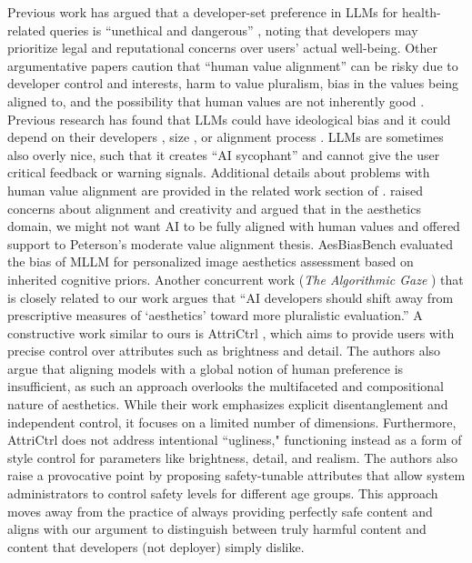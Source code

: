 Previous work has argued that a developer-set preference in LLMs for health-related queries is ``unethical and dangerous'' \cite{guo_position_2025}, noting that developers may prioritize legal and reputational concerns over users’ actual well-being. Other argumentative papers caution that ``human value alignment'' can be risky due to developer control and interests, harm to value pluralism, bias in the values being aligned to, and the possibility that human values are not inherently good \cite{sutrop_challenges_2020, arzberger_nothing_2024, turchin_ai_2019}. Previous research has found that LLMs could have ideological bias \cite{rozado_measuring_2025, faulborn_only_2025, buyl_large_2025, rettenberger_assessing_2025} and it could depend on their developers \cite{buyl_large_2025}, size \cite{rettenberger_assessing_2025}, or alignment process \cite{faulborn_only_2025}. LLMs are sometimes also overly nice, such that it creates ``AI sycophant'' \cite{guo_position_2025, fitzgerald_introducing_2025, sharma_towards_2025, chen_yes-men_2025, arvin_check_2025} and cannot give the user critical feedback or warning signals. Additional details about problems with human value alignment are provided in the related work section of \cite{guo_position_2025}. \cite{helliwell_aesthetic_2024} raised concerns about alignment and creativity and argued that in the aesthetics domain, we might not want AI to be fully aligned with human values and offered support to Peterson’s moderate value alignment thesis. AesBiasBench \cite{li_aesbiasbench_2025} evaluated the bias of MLLM for personalized image aesthetics assessment based on inherited cognitive priors. Another concurrent work (\textit{The Algorithmic Gaze} \cite{taylor_algorithmic_2026}) that is closely related to our work argues that ``AI developers should shift away from prescriptive measures of `aesthetics' toward more pluralistic evaluation.'' A constructive work similar to ours is AttriCtrl \cite{chen_attrictrl_2026}, which aims to provide users with precise control over attributes such as brightness and detail. The authors also argue that aligning models with a global notion of human preference is insufficient, as such an approach overlooks the multifaceted and compositional nature of aesthetics. While their work emphasizes explicit disentanglement and independent control, it focuses on a limited number of dimensions. Furthermore, AttriCtrl does not address intentional ``ugliness," functioning instead as a form of style control for parameters like brightness, detail, and realism. The authors also raise a provocative point by proposing safety-tunable attributes that allow system administrators to control safety levels for different age groups. This approach moves away from the practice of always providing perfectly safe content and aligns with our argument to distinguish between truly harmful content and content that developers (not deployer) simply dislike.

